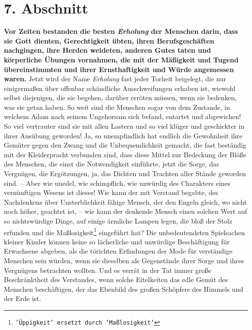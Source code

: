 \section{7. Abschnitt} \label{kap14_ab7}

\label{ref:14_07_wahre_nachfolger_erholung}
 \textbf{Vor Zeiten bestanden die
besten \textit{Erholung} der Menschen darin, dass sie Gott
dienten, Gerechtigkeit übten, ihren Berufsgeschäften nachgingen, ihre Herden
weideten, anderen Gutes taten und körperliche Übungen vornahmen, die mit der
Mäßigkeit und Tugend übereinstimmten und ihrer Ernsthaftigkeit und Würde
angemessen waren.} Jetzt wird der Name \textit{Erholung} fast jeder Torheit
beigelegt, die nur einigermaßen über offenbar schändliche Ausschweifungen
erhaben ist, wiewohl selbst diejenigen, die sie begehen, darüber erröten
müssen, wenn sie bedenken, was sie getan haben. So weit sind die Menschen sogar
von dem Zustande, in welchem Adam nach seinem Ungehorsam
sich befand, entartet
und abgewichen! So viel vertrauter sind sie mit allen Lastern und so viel klüger
und geschickter in ihrer Ausübung geworden! Ja, so unempfindlich hat endlich die
Gewohnheit ihre Gemüter gegen den Zwang und die Unbequemlichkeit gemacht, die
fast beständig mit der Kleiderpracht verbunden sind, dass diese Mittel zur
Bedeckung der Blöße des Menschen, die einst die Notwendigkeit einführte, jetzt
die Sorge, das Vergnügen, die Ergötzungen, ja, das Dichten und Trachten aller
Stände geworden sind. -- Aber wie unedel, wie schimpflich, wie unwürdig des
Charakters eines vernünftigen Wesens ist dieses! Wie kann der mit Verstand
begabte, des Nachdenkens über Unsterblichkeit fähige Mensch, der den
Engeln
gleich, wo nicht noch höher, geachtet ist, -- wie kann der denkende Mensch einen
solchen Wert auf so nichtswürdige Dinge, auf einige ärmliche Lampen legen, die
bloß der Stolz erfunden und die Maßlosigkeit\footnote{\texttt{'Üppigkeit' ersetzt
durch 'Maßlosigkeit'}}
eingeführt hat? Die unbedeutendsten
Spielsachen kleiner Kinder können keine so lächerliche und
unwürdige
Beschäftigung für Erwachsene abgeben, als die törichten Erfindungen der Mode
für verständige Menschen sein würden, wenn sie dieselben als Gegenstände ihrer
Sorge und ihres Vergnügens betrachten wollten. Und es verrät in der Tat immer
große Beschränktheit des Verstandes, wenn solche Eitelkeiten das edle Gemüt des
Menschen beschäftigen, der das Ebenbild des großen Schöpfers des Himmels und der
Erde ist.

